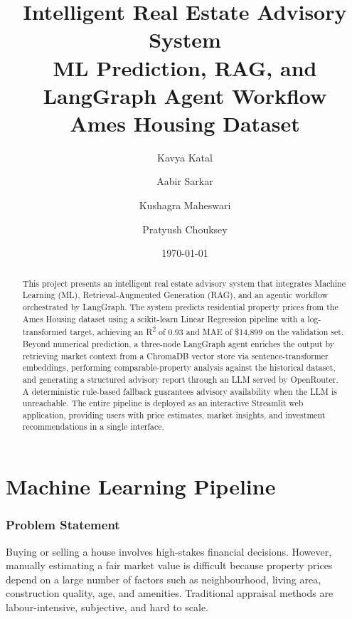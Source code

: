\documentclass[11pt,a4paper]{article}
\title{\textbf{Intelligent Real Estate Advisory System}\\[4pt]
\large ML Prediction, RAG, and LangGraph Agent Workflow\\[2pt]
\normalsize Ames Housing Dataset}
\author{
Kavya Katal \and
Aabir Sarkar \and
Kushagra Maheswari \and
Pratyush Chouksey
}
\date{\today}
\begin{document}
\maketitle

\onehalfspacing

\begin{abstract}
This project presents an intelligent real estate advisory system that integrates Machine Learning (ML), Retrieval-Augmented Generation (RAG), and an agentic workflow orchestrated by LangGraph.
The system predicts residential property prices from the Ames Housing dataset using a scikit-learn Linear Regression pipeline with a log-transformed target, achieving an R\textsuperscript{2} of 0.93 and MAE of \$14,899 on the validation set.
Beyond numerical prediction, a three-node LangGraph agent enriches the output by retrieving market context from a ChromaDB vector store via sentence-transformer embeddings, performing comparable-property analysis against the historical dataset, and generating a structured advisory report through an LLM served by OpenRouter.
A deterministic rule-based fallback guarantees advisory availability when the LLM is unreachable.
The entire pipeline is deployed as an interactive Streamlit web application, providing users with price estimates, market insights, and investment recommendations in a single interface.
\end{abstract}

\tableofcontents
\newpage


\part{Machine Learning Pipeline}

\section{Problem Statement}

Buying or selling a house involves high-stakes financial decisions.
However, manually estimating a fair market value is difficult because property prices depend on a large number of factors such as neighbourhood, living area, construction quality, age, and amenities.
Traditional appraisal methods are labour-intensive, subjective, and hard to scale.
\end{document}
